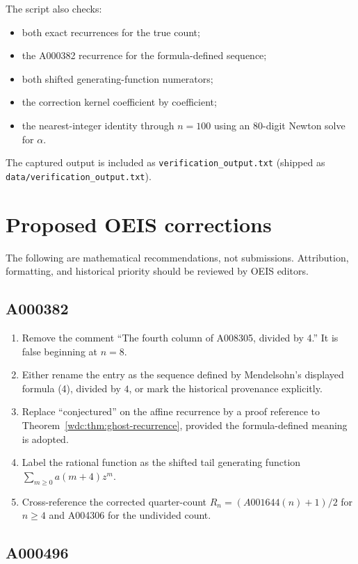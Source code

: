 \documentclass[11pt,letterpaper]{article}
\newcommand{\file}[1]{\nolinkurl{#1}}
\numberwithin{equation}{section}
\theoremstyle{definition}
\begin{document}
The script also checks:
\begin{itemize}[leftmargin=2em]
\item both exact recurrences for the true count;
\item the A000382 recurrence for the formula-defined sequence;
\item both shifted generating-function numerators;
\item the correction kernel coefficient by coefficient;
\item the nearest-integer identity through $n=100$ using an 80-digit Newton
      solve for $\alpha$.
\end{itemize}
The captured output is included as \file{verification_output.txt}
(shipped as \file{data/verification_output.txt}).

\section{Proposed OEIS corrections}\label{wdc:sec:oeis-corrections}

The following are mathematical recommendations, not submissions.  Attribution,
formatting, and historical priority should be reviewed by OEIS editors.

\subsection{A000382}

\begin{enumerate}[leftmargin=2.2em]
\item Remove the comment ``The fourth column of A008305, divided by 4.''  It is
      false beginning at $n=8$.
\item Either rename the entry as the sequence defined by Mendelsohn's displayed
      formula (4), divided by $4$, or mark the historical provenance explicitly.
\item Replace ``conjectured'' on the affine recurrence by a proof reference to
      Theorem~\ref{wdc:thm:ghost-recurrence}, provided the formula-defined meaning
      is adopted.
\item Label the rational function as the shifted tail generating function
      $\sum_{m\ge0}a(m+4)z^m$.
\item Cross-reference the corrected quarter-count $R_n=(A001644(n)+1)/2$ for
      $n\ge4$ and A004306 for the undivided count.
\end{enumerate}

\subsection{A000496}
\end{document}
